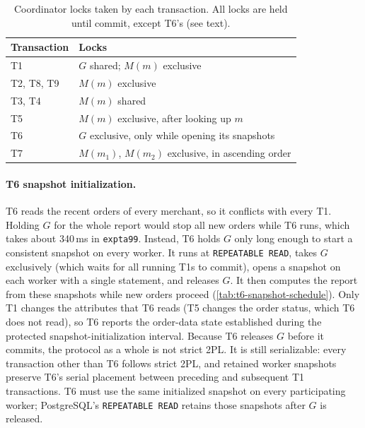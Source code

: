 \documentclass[sigconf,10pt,nonacm]{acmart}
\newcommand{\expt}[1]{\texttt{expt\textunderscore #1}}
\renewcommand{\_}{\underscorewithoutbreak\allowbreak}
\begin{document}
\begin{table}[t]
\caption{Coordinator locks taken by each transaction. All locks are held until commit,
except T6's (see text).}
\label{tab:locks}
\small
\begin{tabular}{@{}ll@{}}
\toprule
Transaction & Locks \\
\midrule
T1 & $G$ shared; $M(m)$ exclusive \\
T2, T8, T9 & $M(m)$ exclusive \\
T3, T4 & $M(m)$ shared \\
T5 & $M(m)$ exclusive, after looking up $m$ \\
T6 & $G$ exclusive, only while opening its snapshots \\
T7 & $M(m_1)$, $M(m_2)$ exclusive, in ascending order \\
\bottomrule
\end{tabular}
\end{table}

\paragraph{T6 snapshot initialization.} T6 reads the recent orders of every merchant, so
it conflicts with every T1. Holding $G$ for the whole report would stop all new orders
while T6 runs, which takes about 340\,ms in \expt{a99}. Instead, T6 holds $G$ only long
enough to start a consistent snapshot on every worker. It runs at \texttt{REPEATABLE
READ}, takes $G$ exclusively (which waits for all running T1s to commit), opens a
snapshot on each worker with a single statement, and releases $G$. It then computes the
report from these snapshots while new orders proceed (\cref{tab:t6-snapshot-schedule}). Only T1
changes the attributes that T6 reads (T5 changes the order status, which T6 does not
read), so T6 reports the order-data state established during the protected
snapshot-initialization interval. Because T6 releases $G$ before it commits, the protocol as a whole is not
strict 2PL. It is still serializable: every transaction other than T6 follows strict
2PL, and retained worker snapshots preserve T6's serial placement between preceding
and subsequent T1 transactions. T6 must use the same initialized snapshot on every
participating worker; PostgreSQL's \texttt{REPEATABLE READ} retains those snapshots
after $G$ is released.
\end{document}
